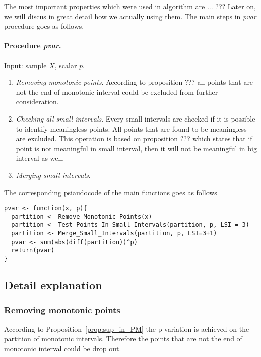 \documentclass[12pt, a4paper]{article}
\numberwithin{equation}{section}
\begin{document}
The most important properties which were used in algorithm are
 ... ??? 
Later on, we will
discus in great detail how we actually using them.
The main steps in \emph{pvar} procedure
goes as follows.


\paragraph{Procedure \emph{pvar}.}
Input: sample $X$, scalar $p$.

\begin{enumerate}
  \item \emph{Removing monotonic points}. According to proposition ???
  all points that are not the end of monotonic interval could be excluded 
  from further consideration. 
  
  \item \emph{Checking all small intervals}. Every small intervals are
    checked if it is possible to identify meaningless points. All points
    that are found to be meaningless are excluded. 
    This operation is based on proposition ??? which states that 
    if point is not meaningful in small interval, then it will not be
    meaningful in big interval as well.
 
  \item \emph{Merging small intervals}.  
  
\end{enumerate}

The corresponding psiaudocode of the main functions goes as follows
\begin{lstlisting}
pvar <- function(x, p){
  partition <- Remove_Monotonic_Points(x) 
  partition <- Test_Points_In_Small_Intervals(partition, p, LSI = 3) 
  partition <- Merge_Small_Intervals(partition, p, LSI=3+1)
  pvar <- sum(abs(diff(partition))^p)  
  return(pvar)
}
\end{lstlisting}
  
\subsection{Detail explanation}

\subsubsection{Removing monotonic points}

According to Proposition~\ref{prop:sup_in_PM}
the p-variation is achieved 
on the partition of monotonic intervals. Therefore the points that are not the end of monotonic interval could be drop out. 
\end{document}
